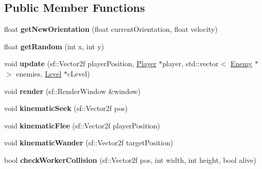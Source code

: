 \subsection*{Public Member Functions}
\begin{DoxyCompactItemize}
\item 
\mbox{\label{class_sweeper___bot_a684db4c0fb076fd1812b05876863a3e3}} 
float {\bfseries get\+New\+Orientation} (float current\+Orientation, float velocity)
\item 
\mbox{\label{class_sweeper___bot_ae99af2103eef40756369ee0eafddb520}} 
float {\bfseries get\+Random} (int x, int y)
\item 
\mbox{\label{class_sweeper___bot_aff44c33059269efdfbb5ef82e2fd6008}} 
void {\bfseries update} (sf\+::\+Vector2f player\+Position, \mbox{\hyperlink{class_player}{Player}} $\ast$player, std\+::vector$<$ \mbox{\hyperlink{class_enemy}{Enemy}} $\ast$ $>$ enemies, \mbox{\hyperlink{class_level}{Level}} $\ast$c\+Level)
\item 
\mbox{\label{class_sweeper___bot_a45a0fac2eabeedc7f4085e7efc4d7925}} 
void {\bfseries render} (sf\+::\+Render\+Window \&window)
\item 
\mbox{\label{class_sweeper___bot_acc630babc907050eb680988ba5122fe9}} 
void {\bfseries kinematic\+Seek} (sf\+::\+Vector2f pos)
\item 
\mbox{\label{class_sweeper___bot_a9b1fe870eebc2dbfb23fd7c6b7285697}} 
void {\bfseries kinematic\+Flee} (sf\+::\+Vector2f player\+Position)
\item 
\mbox{\label{class_sweeper___bot_a82560a44032091b93239a36a06206c8d}} 
void {\bfseries kinematic\+Wander} (sf\+::\+Vector2f target\+Position)
\item 
\mbox{\label{class_sweeper___bot_a23f1bedfe14947b118b5b63a4a8e05a1}} 
bool {\bfseries check\+Worker\+Collision} (sf\+::\+Vector2f pos, int width, int height, bool alive)
\item 
\mbox{\label{class_sweeper___bot_a99091094ce865cf7b339f28b900e98b3}} 

\end{DoxyCompactItemize}
